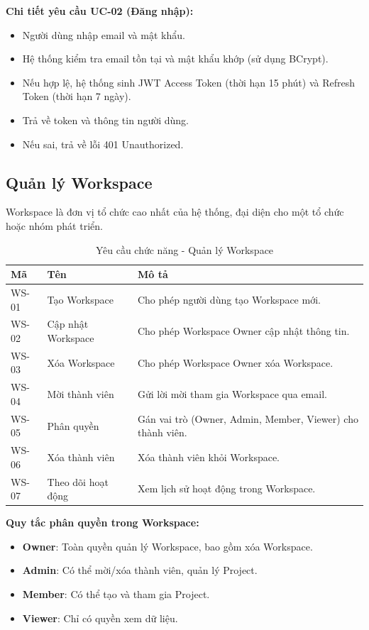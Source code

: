 \documentclass[12pt,a4paper]{report}
\begin{document}
\textbf{Chi tiết yêu cầu UC-02 (Đăng nhập):}

\begin{itemize}
\item Người dùng nhập email và mật khẩu.
\item Hệ thống kiểm tra email tồn tại và mật khẩu khớp (sử dụng BCrypt).
\item Nếu hợp lệ, hệ thống sinh JWT Access Token (thời hạn 15 phút) và Refresh Token (thời hạn 7 ngày).
\item Trả về token và thông tin người dùng.
\item Nếu sai, trả về lỗi 401 Unauthorized.
\end{itemize}

\subsection{Quản lý Workspace}

Workspace là đơn vị tổ chức cao nhất của hệ thống, đại diện cho một tổ chức hoặc nhóm phát triển.

\begin{table}[H]
\centering
\caption{Yêu cầu chức năng - Quản lý Workspace}
\begin{tabular}{|p{2.5cm}|p{3.5cm}|p{8cm}|}
\hline
\textbf{Mã} & \textbf{Tên} & \textbf{Mô tả} \\
\hline
WS-01 & Tạo Workspace & Cho phép người dùng tạo Workspace mới. \\
\hline
WS-02 & Cập nhật Workspace & Cho phép Workspace Owner cập nhật thông tin. \\
\hline
WS-03 & Xóa Workspace & Cho phép Workspace Owner xóa Workspace. \\
\hline
WS-04 & Mời thành viên & Gửi lời mời tham gia Workspace qua email. \\
\hline
WS-05 & Phân quyền & Gán vai trò (Owner, Admin, Member, Viewer) cho thành viên. \\
\hline
WS-06 & Xóa thành viên & Xóa thành viên khỏi Workspace. \\
\hline
WS-07 & Theo dõi hoạt động & Xem lịch sử hoạt động trong Workspace. \\
\hline
\end{tabular}
\label{tab:workspace_management_requirements}
\end{table}

\textbf{Quy tắc phân quyền trong Workspace:}

\begin{itemize}
\item \textbf{Owner}: Toàn quyền quản lý Workspace, bao gồm xóa Workspace.
\item \textbf{Admin}: Có thể mời/xóa thành viên, quản lý Project.
\item \textbf{Member}: Có thể tạo và tham gia Project.
\item \textbf{Viewer}: Chỉ có quyền xem dữ liệu.
\end{itemize}
\end{document}
